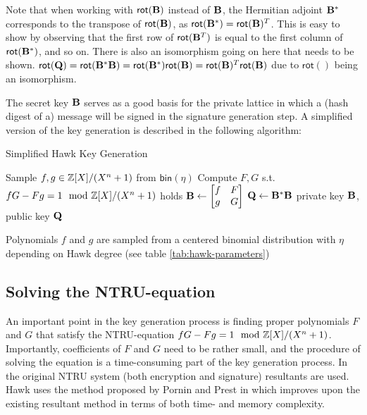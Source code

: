 Note that when working with $\mathsf{rot}(\mathbf{B})$ instead of $\mathbf{B}$, the Hermitian adjoint $\mathbf{B}^*$ corresponds to the transpose of $\mathsf{rot}(\mathbf{B})$, as 
$\mathsf{rot}(\mathbf{B}^*) = \mathsf{rot}(\mathbf{B})^T$. This is easy to show by observing that the first row of $\mathsf{rot}(\mathbf{B}^T)$ is equal to the first column of $\mathsf{rot}(\mathbf{B}^*)$, and so on. 
There is also an isomorphism going on here that needs to be shown.
$\mathsf{rot}(\mathbf{Q}) = \mathsf{rot}(\mathbf{B}^* \mathbf{B}) = \mathsf{rot}(\mathbf{B}^*) \mathsf{rot}(\mathbf{B}) = \mathsf{rot}(\mathbf{B})^T \mathsf{rot}(\mathbf{B})$ due to $\mathsf{rot}()$ being an isomorphism.

The secret key $\mathbf{B}$ serves as a good basis for the private lattice in which a (hash digest of a) message will be signed in the signature generation step.
A simplified version of the key generation is described in the following algorithm:
\begin{algorithm}[H]\label{Simplified Hawk Key Generation}
\caption{Simplified Hawk Key Generation}
\begin{algorithmic}[1]
    \State Sample $f, g \in \mathbb{Z}[X] / (X^n + 1)$ from $\mathsf{bin}(\eta)$
    \State Compute $F, G$ s.t. $fG - Fg = 1 \mod \bb{Z}[X] / (X^n + 1)$ holds
    \State $\mathbf{B} \gets \begin{bmatrix} f & F \\ g & G \end{bmatrix}$
    \State $\mathbf{Q} \gets \mathbf{B}^* \mathbf{B}$
    \State \Return private key $\mathbf{B}$, public key $\mathbf{Q}$
\end{algorithmic}
\end{algorithm}
Polynomials $f$ and $g$ are sampled from a centered binomial distribution with $\eta$ depending on Hawk degree (see table \ref{tab:hawk-parameters})

\subsection{Solving the NTRU-equation}
An important point in the key generation process is finding proper polynomials $F$ and $G$ that satisfy the NTRU-equation $fG - Fg = 1 \mod \bb{Z}[X] / (X^n + 1)$.
Importantly, coefficients of $F$ and $G$ need to be rather small, and the procedure of solving the equation is a time-consuming part of the key generation process. 
In the original NTRU system (both encryption and signature) resultants are used. Hawk uses the method proposed by Pornin and Prest in \cite{PP19} which improves upon the existing
resultant method in terms of both time- and memory complexity.

